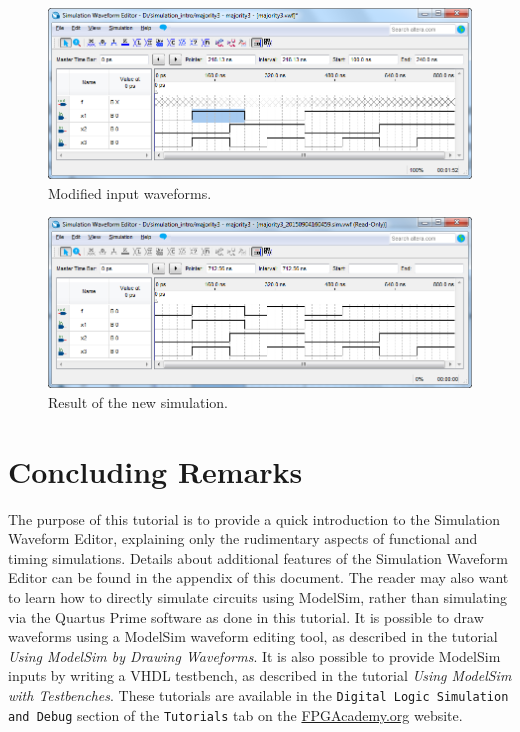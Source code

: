 \documentclass[11pt, twoside, pdftex]{article}
\begin{document}
\begin{figure}[H]
   \begin{center}
      \includegraphics[scale=0.65]{figures/figure18.png}
   \caption{Modified input waveforms.} 
	 \label{fig:18}
	 \end{center}
\end{figure}

\begin{figure}[H]
   \begin{center}
      \includegraphics[scale=0.65]{figures/figure19.png}
   \caption{Result of the new simulation.} 
	 \label{fig:19}
	 \end{center}
\end{figure}


\section{Concluding Remarks}

The purpose of this tutorial is to provide a quick introduction to the Simulation Waveform Editor, 
explaining only the rudimentary aspects of functional and timing simulations. Details about 
additional features of the Simulation Waveform Editor can be found in the appendix of this document. 
The reader may also want to learn how to directly simulate circuits using ModelSim, rather
than simulating via the Quartus Prime software as done in this tutorial. It is possible to
draw waveforms using a ModelSim waveform editing tool, as described in the tutorial
{\it Using ModelSim by Drawing Waveforms}.  It is also possible to provide ModelSim inputs
by writing a VHDL testbench, as described in the tutorial
{\it Using ModelSim with Testbenches}. These tutorials are available in the
\texttt{Digital Logic Simulation and Debug} section of the \texttt{Tutorials} tab on the 
{\href{https://www.fpgacademy.org/tutorials.html} {FPGAcademy.org}} website.
\end{document}
